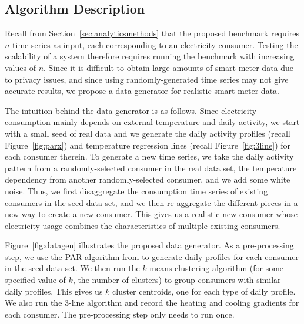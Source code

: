 \documentclass[prodmode,acmtods]{acmsmall}
\begin{document}
\subsection{Algorithm Description}

Recall from Section~\ref{sec:analyticsmethods} that the proposed benchmark requires $n$ time series as input, each corresponding to an electricity consumer.  Testing the scalability of a system therefore requires running the benchmark with increasing values of $n$.  Since it is difficult to obtain large amounts of smart meter data due to privacy issues, and since using randomly-generated time series may not give accurate results, we propose a data generator for realistic smart meter data.

The intuition behind the data generator is as follows.  Since electricity consumption mainly depends on external temperature and daily activity, we start with a small seed of real data and we generate the daily activity profiles (recall Figure~\ref{fig:parx}) and temperature regression lines (recall Figure~\ref{fig:3line}) for each consumer therein.  To generate a new time series, we take the daily activity pattern from a randomly-selected consumer in the real data set, the temperature dependency from another randomly-selected consumer, and we add some white noise.  Thus, we first disaggregate the consumption time series of existing consumers in the seed data set, and we then re-aggregate the different pieces in a new way to create a new consumer.
This gives us a realistic new consumer whose electricity usage combines the characteristics of multiple existing consumers.

Figure~\ref{fig:datagen} illustrates the proposed data generator.  As a pre-processing step, we use the PAR algorithm from \cite{espinoza} to generate daily profiles for each consumer in the seed data set.  We then run the $k$-means clustering algorithm (for some specified value of $k$, the number of clusters) to group consumers with similar daily profiles.  This gives us $k$ cluster centroids, one for each type of daily profile.  We also run the 3-line algorithm and record the heating and cooling gradients for each consumer.  The pre-processing step only needs to run once. 
\end{document}
